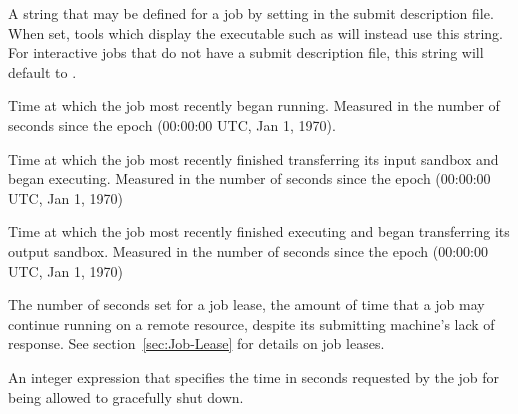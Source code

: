 \begin{description}
\label{JobDescription-job-attribute}
\item[\AdAttr{JobDescription}:]  A string that may be defined for
a job by setting  in the submit description file.
When set, tools which display the executable such as 
will instead use this string.
For interactive jobs that do not have a submit description file,
this string will default to .

\label{JobCurrentStartDate-job-attribute}
\item[\AdAttr{JobCurrentStartDate}:]  Time at which the job most recently began
running.  Measured in the
number of seconds since the epoch (00:00:00 UTC, Jan 1, 1970).  

\label{JobCurrentStartExecutingDate-job-attribute}
\item[\AdAttr{JobCurrentStartExecutingDate}:]  Time at which the job most recently finished
transferring its input sandbox and began executing.  Measured in the
number of seconds since the epoch (00:00:00 UTC, Jan 1, 1970)

\label{JobCurrentStartTransferOutputDate-job-attribute}
\item[\AdAttr{JobCurrentStartTransferOutputDate}:]  Time at which the job most recently finished
executing and began transferring its output sandbox.  Measured in the
number of seconds since the epoch (00:00:00 UTC, Jan 1, 1970)


\item[\AdAttr{JobLeaseDuration}:]  The number of seconds set for
a job lease, the amount of time that a job may continue running
on a remote resource,
despite its submitting machine's lack of response.
See section~\ref{sec:Job-Lease} for details on job leases.

\item[\AdAttr{JobMaxVacateTime}:] An integer expression that specifies
the time in seconds requested by the job for being allowed to
gracefully shut down.


\end{description}

